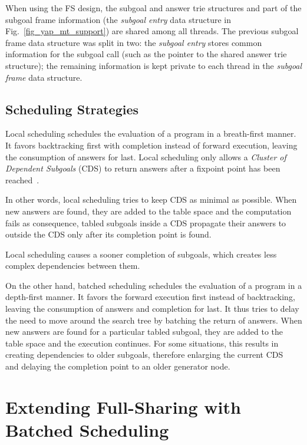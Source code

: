 \documentclass{llncs}
\begin{document}
When using the FS design, the subgoal and answer trie structures and
part of the subgoal frame information (the \emph{subgoal entry} data
structure in Fig.~\ref{fig_yap_mt_support}) are shared among all
threads. The previous subgoal frame data structure was split in two:
the \emph{subgoal entry} stores common information for the subgoal
call (such as the pointer to the shared answer trie structure); the
remaining information is kept private to each thread in the
\emph{subgoal frame} data structure.


\subsection{Scheduling Strategies}

Local scheduling schedules the evaluation of a program in a
breath-first manner. It favors backtracking first with completion
instead of forward execution, leaving the consumption of answers for
last. Local scheduling only allows a \emph{Cluster of Dependent
  Subgoals} (CDS) to return answers after a fixpoint point has been
reached~\cite{Freire-96}.

In other words, local scheduling tries
to keep CDS as minimal as possible. When new answers are found, they
are added to the table space and the computation fails as consequence,
tabled subgoals inside a CDS propagate their answers to outside the
CDS only after its completion point is found.

Local scheduling causes a sooner completion of subgoals, which creates
less complex dependencies between them.

On the other hand, batched scheduling schedules the evaluation of a
program in a depth-first manner. It favors the forward execution first
instead of backtracking, leaving the consumption of answers and
completion for last. It thus tries to delay the need to move around
the search tree by batching the return of answers. When new answers
are found for a particular tabled subgoal, they are added to the table
space and the execution continues. For some situations, this results
in creating dependencies to older subgoals, therefore enlarging the
current CDS~\cite{Sagonas-98} and delaying the completion point to an
older generator node.


\section{Extending Full-Sharing with Batched Scheduling}
\end{document}
